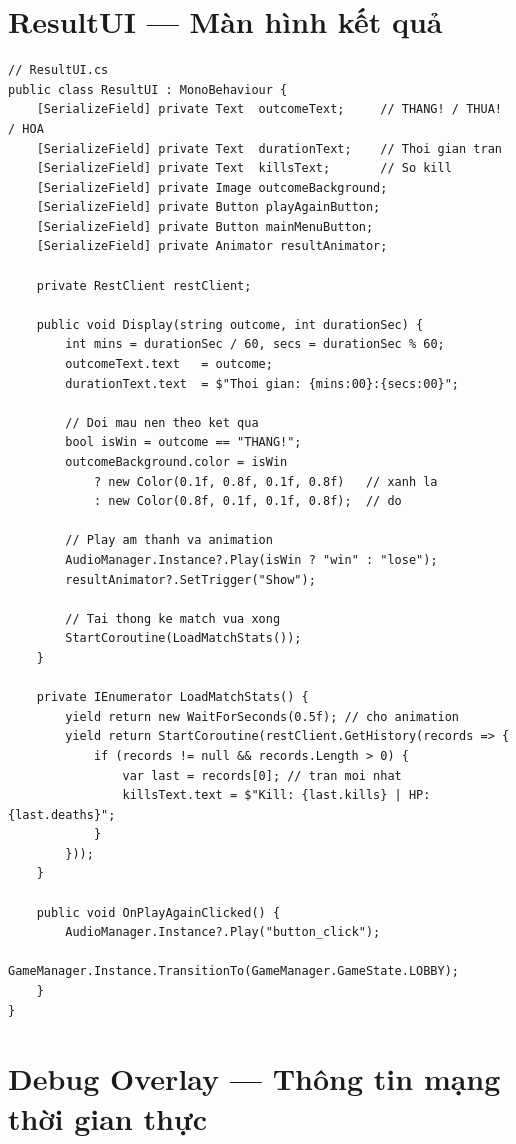 \documentclass[12pt,a4paper]{report}
\begin{document}
\section{ResultUI --- Màn hình kết quả}

\begin{lstlisting}[style=bashStyle, caption={ResultUI --- hiển thị kết quả và thống kê}, label={lst:resultui}]
// ResultUI.cs
public class ResultUI : MonoBehaviour {
    [SerializeField] private Text  outcomeText;     // THANG! / THUA! / HOA
    [SerializeField] private Text  durationText;    // Thoi gian tran
    [SerializeField] private Text  killsText;       // So kill
    [SerializeField] private Image outcomeBackground;
    [SerializeField] private Button playAgainButton;
    [SerializeField] private Button mainMenuButton;
    [SerializeField] private Animator resultAnimator;

    private RestClient restClient;

    public void Display(string outcome, int durationSec) {
        int mins = durationSec / 60, secs = durationSec % 60;
        outcomeText.text   = outcome;
        durationText.text  = $"Thoi gian: {mins:00}:{secs:00}";

        // Doi mau nen theo ket qua
        bool isWin = outcome == "THANG!";
        outcomeBackground.color = isWin
            ? new Color(0.1f, 0.8f, 0.1f, 0.8f)   // xanh la
            : new Color(0.8f, 0.1f, 0.1f, 0.8f);  // do

        // Play am thanh va animation
        AudioManager.Instance?.Play(isWin ? "win" : "lose");
        resultAnimator?.SetTrigger("Show");

        // Tai thong ke match vua xong
        StartCoroutine(LoadMatchStats());
    }

    private IEnumerator LoadMatchStats() {
        yield return new WaitForSeconds(0.5f); // cho animation
        yield return StartCoroutine(restClient.GetHistory(records => {
            if (records != null && records.Length > 0) {
                var last = records[0]; // tran moi nhat
                killsText.text = $"Kill: {last.kills} | HP: {last.deaths}";
            }
        }));
    }

    public void OnPlayAgainClicked() {
        AudioManager.Instance?.Play("button_click");
        GameManager.Instance.TransitionTo(GameManager.GameState.LOBBY);
    }
}
\end{lstlisting}

\section{Debug Overlay --- Thông tin mạng thời gian thực}
\end{document}
